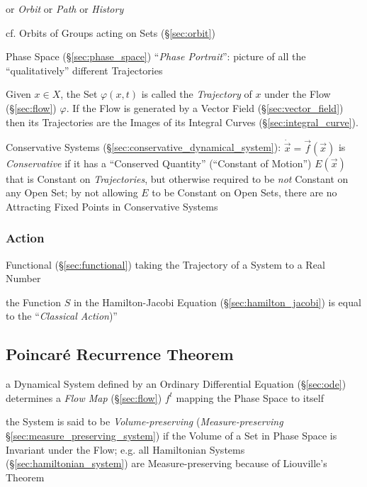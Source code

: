 or \emph{Orbit} or \emph{Path} or \emph{History}

\fist cf. Orbits of Groups acting on Sets (\S\ref{sec:orbit})

Phase Space (\S\ref{sec:phase_space}) ``\emph{Phase Portrait}'': picture of all
the ``qualitatively'' different Trajectories

Given $x \in X$, the Set $\varphi(x,t)$ is called the \emph{Trajectory} of $x$
under the Flow (\S\ref{sec:flow}) $\varphi$. If the Flow is generated by a
Vector Field (\S\ref{sec:vector_field}) then its Trajectories are the Images of
its Integral Curves (\S\ref{sec:integral_curve}).

Conservative Systems (\S\ref{sec:conservative_dynamical_system}):
$\dot{\vec{x}} = \vec{f}(\vec{x})$ is \emph{Conservative} if it has a
``Conserved Quantity'' (``Constant of Motion'') $E(\vec{x})$ that is Constant
on \emph{Trajectories}, but otherwise required to be \emph{not} Constant on any
Open Set;
by not allowing $E$ to be Constant on Open Sets, there are no Attracting Fixed
Points in Conservative Systems



\subsubsection{Action}\label{sec:trajectory_action}

Functional (\S\ref{sec:functional}) taking the Trajectory of a System to a Real
Number

the Function $S$ in the Hamilton-Jacobi Equation (\S\ref{sec:hamilton_jacobi})
is equal to the ``\emph{Classical Action})''



\subsection{Poincar\'e Recurrence Theorem}\label{sec:poincare_recurrence}

a Dynamical System defined by an Ordinary Differential Equation
(\S\ref{sec:ode}) determines a \emph{Flow Map} (\S\ref{sec:flow}) $f^t$ mapping
the Phase Space to itself

the System is said to be \emph{Volume-preserving} (\emph{Measure-preserving}
\S\ref{sec:measure_preserving_system}) if the Volume of a Set in Phase Space is
Invariant under the Flow;
e.g. all Hamiltonian Systems (\S\ref{sec:hamiltonian_system}) are
Measure-preserving because of Liouville's Theorem

